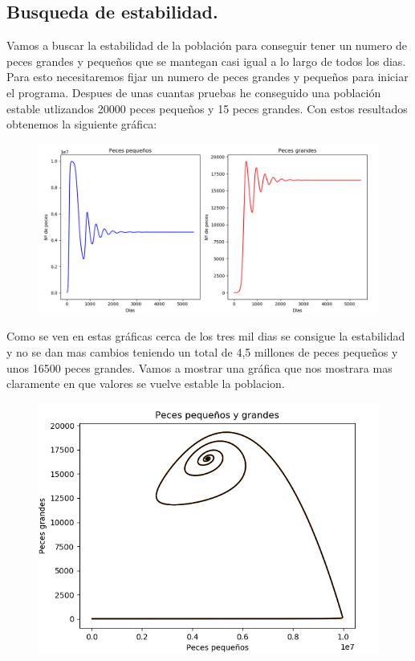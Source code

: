 \documentclass[]{article}
\begin{document}
\subsection{Busqueda de estabilidad.}
Vamos a buscar la estabilidad de la población para conseguir tener un numero de peces grandes y pequeños que se mantegan casi igual a lo largo de todos los dias. Para esto necesitaremos fijar un numero de peces grandes y pequeños para iniciar el programa. Despues de unas cuantas pruebas he conseguido una población estable utlizandos 20000 peces pequeños y 15 peces grandes. Con estos resultados obtenemos la siguiente gráfica:
\begin{figure}[H]
	\centering
	\includegraphics[width=1\linewidth]{img/screenshot0024}
	\caption{}
	\label{fig:screenshot0024}
\end{figure}
Como se ven en estas gráficas cerca de los tres mil dias se consigue la estabilidad y no se dan mas cambios teniendo un total de 4,5 millones de peces pequeños y unos 16500 peces grandes. 
Vamos a mostrar una gráfica que nos mostrara mas claramente en que valores se vuelve estable la poblacion.
\begin{figure}[H]
	\centering
	\includegraphics[width=0.7\linewidth]{img/screenshot0021}
	\label{fig:screenshot0021}
\end{figure}
\end{document}
